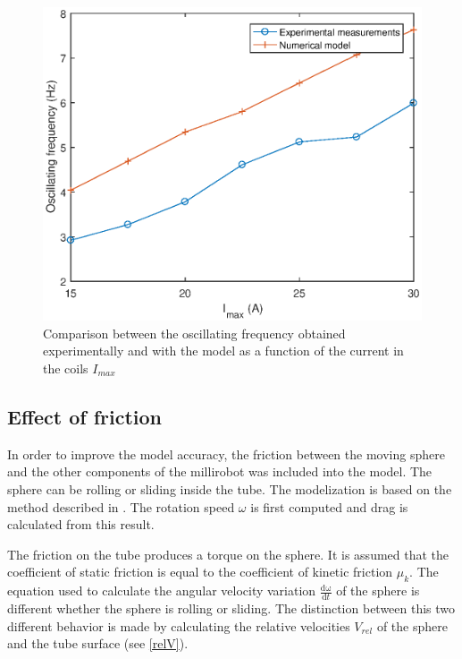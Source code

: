\documentclass[letterpaper, 10 pt, conference]{ieeeconf}  %
\begin{document}
\begin{figure}
\label{experiment}
  \includegraphics[width=\linewidth]{figure3.eps}
  \caption{Comparison between the oscillating frequency obtained experimentally and with the model as a function of the current in the coils $I_{max}$}
  \label{freq}
\end{figure}

\subsection{Effect of friction}

In order to improve the model accuracy, the friction between the moving sphere and the other components of the millirobot was included into the model. The sphere can be rolling or sliding inside the tube. The modelization is based on the method described in \cite{00319120303009}. The rotation speed $\omega$ is first computed and drag is calculated from this result.\par
The friction on the tube produces a torque on the sphere. It is assumed that the coefficient of static friction is equal to the coefficient of kinetic friction $\mu_k$. The equation used to calculate the angular velocity variation $\frac{\mathrm{d\omega } }{\mathrm{d} t}$ of the sphere is different whether the sphere is rolling or sliding. The distinction between this two different behavior is made by calculating the relative velocities $V_{rel}$ of the sphere and the tube surface (see \cref{relV}). \par
\end{document}

